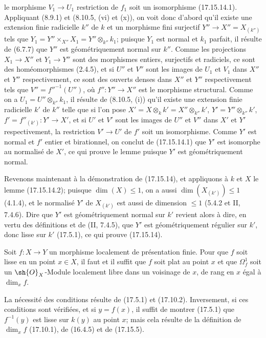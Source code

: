 le morphisme $V_1\to U_1$ restriction de $f_1$ soit un isomorphisme (17.15.14.1). Appliquant (8.9.1) et (8.10.5, (vi) et (x)), on voit donc d'abord qu'il existe une extension finie radicielle $k''$ de $k$ et un morphisme fini surjectif $Y''\to X''=X_{(k'')}$ tels que $Y_1=Y''\times_{X''}X_1=Y''\otimes_{k''}k_1$; puisque $Y_1$ est normal et $k_1$ parfait, il résulte de (6.7.7) que $Y''$ est géométriquement normal sur $k''$. Comme les projections $X_1\to X''$ et $Y_1\to Y''$ sont des morphismes entiers, surjectifs et radiciels, ce sont des homéomorphismes (2.4.5), et si $U''$ et $V''$ sont les images de $U_1$ et $V_1$ dans $X''$ et $Y''$ respectivement, ce sont des ouverts denses dans $X''$ et $Y''$ respectivement tels que $V''=f''^{-1}(U'')$, où $f'':Y''\to X''$ est le morphisme structural. Comme on a $U_1=U''\otimes_{k''}k_1$, il résulte de (8.10.5, (i)) qu'il existe une extension finie radicielle $k'$ de $k''$ telle que si l'on pose $X'=X\otimes_k k'=X''\otimes_{k''}k'$, $Y'=Y''\otimes_{k''}k'$, $f'=f''_{(k')}:Y'\to X'$, et si $U'$ et $V'$ sont les images de $U''$ et $V''$ dans $X'$ et $Y'$ respectivement, la restriction $V'\to U'$ de $f'$ soit un isomorphisme. Comme $Y'$ est normal et $f'$ entier et birationnel, on conclut de (17.15.14.1) que $Y'$ est isomorphe au normalisé de $X'$, ce qui prouve le lemme puisque $Y'$ est géométriquement normal.

Revenons maintenant à la démonstration de (17.15.14), et appliquons à $k$ et $X$ le lemme (17.15.14.2); puisque $\dim(X)\leq1$, on a aussi $\dim(X_{(k')})\leq1$ (4.1.4), et le normalisé $Y'$ de $X_{(k')}$ est aussi de dimension $\leq1$ (5.4.2 et II, 7.4.6). Dire que $Y'$ est géométriquement normal sur $k'$ revient alors à dire, en vertu des définitions et de (II, 7.4.5), que $Y'$ est géométriquement régulier sur $k'$, donc lisse sur $k'$ (17.5.1), ce qui prouve (17.15.14).

\begin{proposition}[17.15.15]
\label{IV.17.15.15}
Soit $f:X\to Y$ un morphisme localement de présentation finie. Pour que $f$ soit lisse en un point $x\in X$, il faut et il suffit que $f$ soit plat au point $x$ et que $\Omega^1_f$ soit un $\sh{O}_X$-Module localement libre dans un voisinage de $x$, de rang en $x$ égal à $\dim_x f$.
\end{proposition}

La nécessité des conditions résulte de (17.5.1) et (17.10.2). Inversement, si ces conditions sont vérifiées, et si $y=f(x)$, il suffit de montrer (17.5.1) que $f^{-1}(y)$ est lisse sur $k(y)$ au point $x$; mais cela résulte de la définition de $\dim_x f$ (17.10.1), de (16.4.5) et de (17.15.5).

